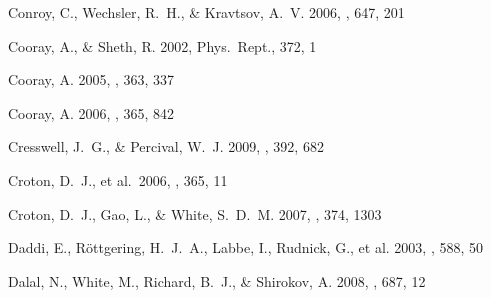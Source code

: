 \documentclass[]{emulateapj}
\begin{document}
\begin{thebibliography}{999}
Conroy, C., Wechsler, R.\ H., \& Kravtsov, A.\ V. 2006,
\apj, 647, 201 %


Cooray, A., \& Sheth, R. 2002,
Phys.\ Rept., 372, 1



Cooray, A. 2005,  \mnras, 363, 337

Cooray, A. 2006,
\mnras, 365, 842 %

Cresswell, J.\ G., \& Percival, W.\ J. 2009,
\mnras, 392, 682

Croton, D.~J., et al.\ 2006, \mnras, 365, 11

Croton, D.\ J., Gao, L., \& White, S.\ D.\ M.  2007,
\mnras, 374, 1303  

Daddi, E., R\"{o}ttgering, H.\ J.\ A., Labbe, I., Rudnick, G., et al. 2003,
\apj, 588, 50

Dalal, N., White, M., Richard, B.\ J., \& Shirokov, A. 2008,
\apj, 687, 12


\end{thebibliography}
\end{document}
